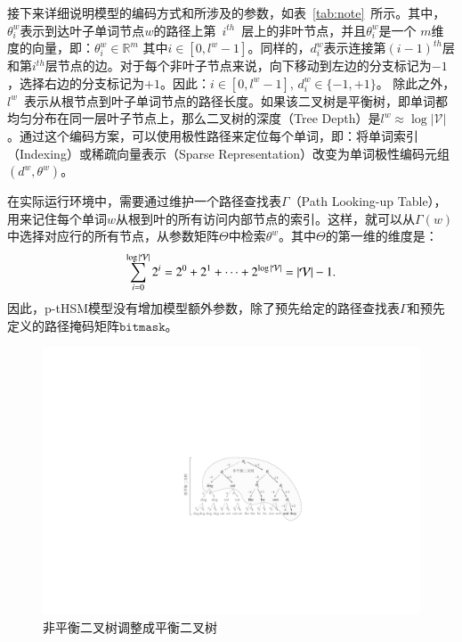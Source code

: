 接下来详细说明模型的编码方式和所涉及的参数，如表~\ref{tab:note}~所示。其中，$\theta_i^w $表示到达叶子单词节点$w$的路径上第~$i^{th}$~层上的非叶节点，并且$\theta_i ^ w$是一个 $m$维度的向量，即：$\theta_i^w \in\mathbb{R}^m $ 其中$ i \in [0, l^w-1] $。同样的，$ d_i^w $表示连接第$(i-1)^{th}$层和第$i^{th}$层节点的边。对于每个非叶子节点来说，向下移动到左边的分支标记为$ -1 $，选择右边的分支标记为$ + 1 $。因此：$i\in[0,l^w-1]$, $d_i^w\in \{-1,+1\}$。 除此之外， $l^w$~表示从根节点到叶子单词节点的路径长度。如果该二叉树是平衡树，即单词都均匀分布在同一层叶子节点上，那么二叉树的深度（Tree Depth）是$l^w\approx \log \mathcal{|V|}$ 。通过这个编码方案，可以使用极性路径来定位每个单词，即：将单词索引（Indexing）或稀疏向量表示（Sparse Representation）改变为单词极性编码元组$(d^w,\theta^w)$。



在实际运行环境中，需要通过维护一个路径查找表$\Gamma$（Path Looking-up Table），用来记住每个单词$ w $从根到叶的所有访问内部节点的索引。这样，就可以从$ \Gamma(w)$中选择对应行的所有节点，从参数矩阵${\Theta} $中检索$ \theta ^ w $。其中${\Theta} $的第一维的维度是：
\begin{equation}\label{equ:sums}
\setlength{\abovedisplayskip}{6pt}
\setlength{\belowdisplayskip}{6pt}
\sum_{i=0}^{\log \mathcal{|V|}}{2^i} =2^0+2^1+\cdots+2^{\log \mathcal{|V|}}= \mathcal{|V|} -1.
\end{equation}
因此，p-tHSM模型没有增加模型额外参数，除了预先给定的路径查找表$\Gamma$和预先定义的路径掩码矩阵$\mathtt{bitmask}$。


\begin{figure}[!t]
  \centering
\includegraphics[width=0.9\linewidth]{./figures/thsm-example-mask.pdf}
\caption{非平衡二叉树调整成平衡二叉树}\label{fig:case_thsm_mask}
\end{figure}




